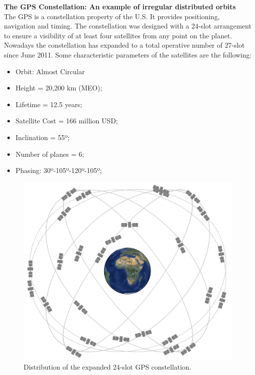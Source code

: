 
\textbf{The GPS Constellation: An example of irregular distributed orbits \cite{GPS}}
\\
The GPS is a constellation property of the U.S. It provides positioning, navigation and timing. The constellation was designed with a 24-slot arrangement to ensure a visibility of at least four satellites from any point on the planet. Nowadays the constellation has expanded to a total operative number of 27-slot since June 2011. Some characteristic parameters of the satellites are the following:

\begin{itemize}
\item Orbit: Almost Circular
\item Height = 20,200 km (MEO);
\item Lifetime = 12.5 years;
\item Satellite Cost = 166 million USD;
\item Inclination = 55º;
\item Number of planes = 6;
\item Phasing: 30º-105º-120º-105º;
\end{itemize}

\begin{figure}[H]
\begin{center}
\includegraphics[scale=0.16]{GPSconstellation.jpg}
\caption{Distribution of the expanded 24-slot GPS constellation.\cite{GPS}}
\end{center}
\end{figure}